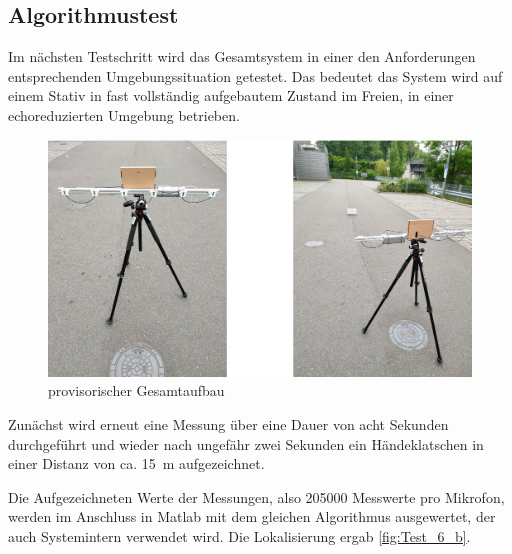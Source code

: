 \subsection{Algorithmustest}

Im nächsten Testschritt wird das Gesamtsystem in einer den Anforderungen entsprechenden Umgebungssituation getestet. Das bedeutet das System wird auf einem Stativ in fast vollständig aufgebautem Zustand im Freien, in einer echoreduzierten Umgebung betrieben.

\begin{figure}[!h]
	\begin{center}
		\includegraphics[scale=0.2]{Sections/Tests/Gesamtaufbau}
	\end{center}
	\caption{provisorischer Gesamtaufbau}
	\label{fig:Test_4}
\end{figure}

Zunächst wird erneut eine Messung über eine Dauer von acht Sekunden durchgeführt und wieder nach ungefähr zwei Sekunden ein Händeklatschen in einer Distanz von ca. \SI{15}{m} aufgezeichnet.

Die Aufgezeichneten Werte  der Messungen, also 205000 Messwerte pro Mikrofon, werden im Anschluss in Matlab mit dem gleichen Algorithmus ausgewertet, der auch Systemintern verwendet wird. Die Lokalisierung ergab \autoref{fig:Test_6_b}.

